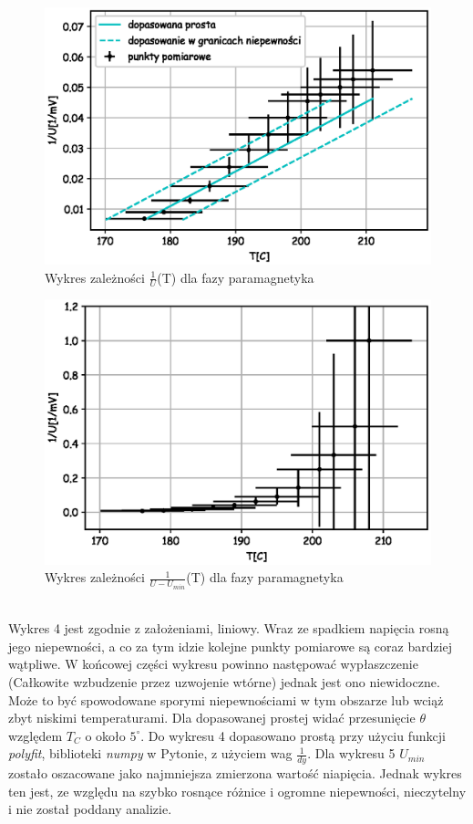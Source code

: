 \documentclass[a4paper,10pt]{article}
\begin{document}
\begin{figure}[H]
  \includegraphics{./Curie_odwrotnosc.eps}
  \caption{Wykres zależności $\frac{1}{U}$(T) dla fazy paramagnetyka}
\end{figure}
\begin{figure}[H]
  \includegraphics{./Curie_odjete.eps}
  \caption{Wykres zależności $\frac{1}{U-U_{min}}$(T) dla fazy paramagnetyka}
\end{figure}
\\Wykres 4 jest zgodnie z założeniami, liniowy. Wraz ze spadkiem napięcia rosną jego niepewności, a co za tym idzie kolejne punkty pomiarowe są coraz bardziej wątpliwe. W końcowej części wykresu powinno następować wypłaszczenie (Całkowite wzbudzenie przez uzwojenie wtórne) jednak jest ono niewidoczne. Może to być spowodowane sporymi niepewnościami w tym obszarze lub wciąż zbyt niskimi temperaturami. Dla dopasowanej prostej widać przesunięcie $\theta$ względem $T_C$ o około $5^\circ$. Do wykresu 4 dopasowano prostą przy użyciu funkcji \emph{polyfit}, biblioteki \emph{numpy} w Pytonie, z
użyciem wag $\frac{1}{dy}$. Dla wykresu 5 $U_{min}$ zostało oszacowane jako najmniejsza zmierzona wartość niapięcia. Jednak wykres ten jest, ze względu na szybko rosnące różnice i ogromne niepewności, nieczytelny i nie został poddany analizie. 
\\
\end{document}
